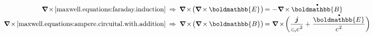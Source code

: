 \nopagebreak\begin{equation*}
\begin{array}{r@{\hspace{.5em}}c@{\hspace{.5em}}r@{\hspace{.3em}}c@{\hspace{.3em}}l}
\boldnabla \hspace{-0.25ex} \times \hspace{-0.25ex} \eqref{maxwell.equations:faraday.induction}
& \Rightarrow &
\boldnabla \hspace{-0.2ex} \times \hspace{-0.3ex} \bigl( \boldnabla \hspace{-0.15ex} \times \hspace{-0.1ex} \boldmathbb{E} \hspace{.1ex} \bigr) \hspace*{-0.3ex} &
= &
- \hspace{.1ex} \boldnabla \hspace{-0.15ex} \times \hspace{-0.1ex} \mathdotabove{\boldmathbb{B}}
\\[.1em]
%
\boldnabla \hspace{-0.25ex} \times \hspace{-0.25ex} \eqref{maxwell.equations:ampere.circuital.with.addition}
& \Rightarrow &
\boldnabla \hspace{-0.2ex} \times \hspace{-0.3ex} \bigl( \boldnabla \hspace{-0.15ex} \times \hspace{-0.1ex} \boldmathbb{B} \bigr) \hspace*{-0.3ex} &
= &
\boldnabla \hspace{-0.12ex} \times \hspace{-0.33ex} \biggl( \displaystyle \frac{\currentdensity}{\raisemath{-0.1em}{ \vacuumpermittivity \hspace{.1ex} c^{\hspace{.16ex}2} }} + \hspace{.1ex} \displaystyle \frac{\raisemath{-0.12em}{ \mathdotabove{\boldmathbb{E}} }}{\raisemath{-0.1em}{ c^{\hspace{.16ex}2} }} \biggr)
\end{array}
\end{equation*}


